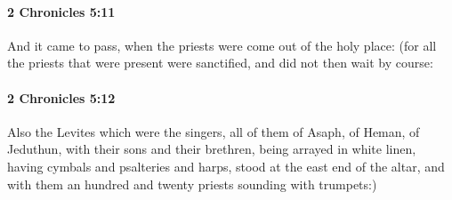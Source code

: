 		\paragraph{2 Chronicles 5:11} %
			\label{2CHRONICLES-5-11}

			And it came to pass, when the priests were come out of the holy place: (for all the priests that were present were sanctified, and did not then wait by course:


		\paragraph{2 Chronicles 5:12} %
			\label{2CHRONICLES-5-12}

			Also the Levites which were the singers, all of them of Asaph, of Heman, of Jeduthun, with their sons and their brethren, being arrayed in white linen, having cymbals and psalteries and harps, stood at the east end of the altar, and with them an hundred and twenty priests sounding with trumpets:)

